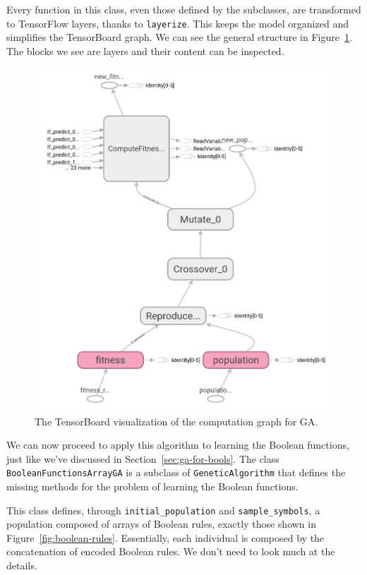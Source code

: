 Every function in this class, even those defined by the subclasses, are
transformed to TensorFlow layers, thanks to \texttt{layerize}. This keeps the
model organized and simplifies the TensorBoard graph. We can see the general
structure in Figure~\ref{fig:tb-graph-ga}. The blocks we see are layers and
their content can be inspected.
\begin{figure}
	\centering
	\includegraphics[height=0.45\textheight]{./imgs/ga-graph.png}
	\caption{The TensorBoard visualization of the computation graph for GA.}
	\label{fig:tb-graph-ga}
\end{figure}

We can now proceed to apply this algorithm to learning the Boolean functions,
just like we've discussed in Section~\ref{sec:ga-for-bools}.
The class \texttt{BooleanFunctionsArrayGA} is a subclass of
\texttt{GeneticAlgorithm} that defines the missing methods for the problem of
learning the Boolean functions.

This class defines, through \verb|initial_population| and
\verb|sample_symbols|, a population composed of arrays of Boolean rules,
exactly those shown in Figure~\vref{fig:boolean-rules}. Essentially, each
individual is composed by the concatenation of encoded Boolean rules. We don't
need to look much at the details.

